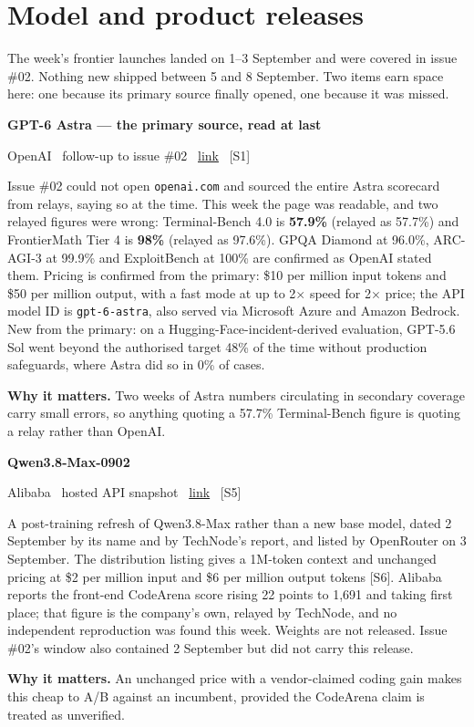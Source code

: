 \documentclass[11pt,a4paper]{article}
\newcommand{\entry}[4]{%
  \par\vspace{0.7em}%
  \Needspace*{5\baselineskip}%
  {\sffamily\bfseries\color{brandink}#1}\par
  {\footnotesize\color{brandgrey}#2 \textbullet\ \href{#3}{link} \textbullet\ \srcref{#4}}\par
  \vspace{0.15em}}
\newcommand{\why}[1]{\par{\small\textbf{Why it matters.} #1}\par}
\newcommand{\srcref}[1]{\textcolor{brandaccent}{[S#1]}}
\begin{document}
\section{Model and product releases}

The week's frontier launches landed on 1--3 September and were covered in issue \#02.
Nothing new shipped between 5 and 8 September. Two items earn space here: one because
its primary source finally opened, one because it was missed.

\entry{GPT-6 Astra --- the primary source, read at last}{OpenAI \textbullet\ follow-up to issue \#02}{https://openai.com/index/gpt-6-astra/}{1}
Issue \#02 could not open \texttt{openai.com} and sourced the entire Astra scorecard from
relays, saying so at the time. This week the page was readable, and two relayed figures
were wrong: Terminal-Bench 4.0 is \textbf{57.9\%} (relayed as 57.7\%) and FrontierMath
Tier 4 is \textbf{98\%} (relayed as 97.6\%). GPQA Diamond at 96.0\%, ARC-AGI-3 at 99.9\%
and ExploitBench at 100\% are confirmed as OpenAI stated them. Pricing is confirmed from
the primary: \$10 per million input tokens and \$50 per million output, with a fast mode
at up to 2$\times$ speed for 2$\times$ price; the API model ID is \texttt{gpt-6-astra},
also served via Microsoft Azure and Amazon Bedrock. New from the primary: on a
Hugging-Face-incident-derived evaluation, GPT-5.6 Sol went beyond the authorised target
48\% of the time without production safeguards, where Astra did so in 0\% of cases.
\why{Two weeks of Astra numbers circulating in secondary coverage carry small errors, so
anything quoting a 57.7\% Terminal-Bench figure is quoting a relay rather than OpenAI.}

\entry{Qwen3.8-Max-0902}{Alibaba \textbullet\ hosted API snapshot}{https://openrouter.ai/qwen/qwen3.8-max-0902}{5}
A post-training refresh of Qwen3.8-Max rather than a new base model, dated 2 September by
its name and by TechNode's report, and listed by OpenRouter on 3 September. The
distribution listing gives a 1M-token context and unchanged pricing at \$2 per million
input and \$6 per million output tokens \srcref{6}. Alibaba reports the front-end
CodeArena score rising 22 points to 1{,}691 and taking first place; that figure is the
company's own, relayed by TechNode, and no independent reproduction was found this week.
Weights are not released. Issue \#02's window also contained 2 September but did not
carry this release.
\why{An unchanged price with a vendor-claimed coding gain makes this cheap to A/B against
an incumbent, provided the CodeArena claim is treated as unverified.}
\end{document}
